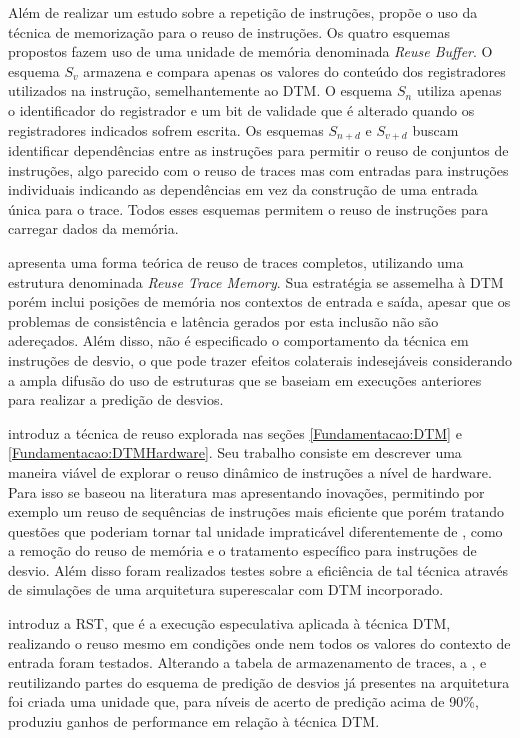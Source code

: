 Além de realizar um estudo sobre a repetição de instruções,  propõe o uso da técnica de memorização para o reuso de instruções. Os quatro esquemas propostos fazem uso de uma unidade de memória denominada \textit{Reuse Buffer}. O esquema $S_{v}$ armazena e compara apenas os valores do conteúdo dos registradores utilizados na instrução, semelhantemente ao DTM. O esquema $S_{n}$ utiliza apenas o identificador do registrador e um bit de validade que é alterado quando os registradores indicados sofrem escrita. Os esquemas $S_{n+d}$ e $S_{v+d}$ buscam identificar dependências entre as instruções para permitir o reuso de conjuntos de instruções, algo parecido com o reuso de traces mas com entradas para instruções individuais indicando as dependências em vez da construção de uma entrada única para o trace. Todos esses esquemas permitem o reuso de instruções para carregar dados da memória.

 apresenta uma forma teórica de reuso de traces completos, utilizando uma estrutura denominada \textit{Reuse Trace Memory}. Sua estratégia se assemelha à DTM porém inclui posições de memória nos contextos de entrada e saída, apesar que os problemas de consistência e latência gerados por esta inclusão não são adereçados. Além disso, não é especificado o comportamento da técnica em instruções de desvio, o que pode trazer efeitos colaterais indesejáveis considerando a ampla difusão do uso de estruturas que se baseiam em execuções anteriores para realizar a predição de desvios.

 introduz a técnica de reuso explorada nas seções \ref{Fundamentacao:DTM} e \ref{Fundamentacao:DTMHardware}. Seu trabalho consiste em descrever uma maneira viável de explorar o reuso dinâmico de instruções a nível de hardware. Para isso se baseou na literatura mas apresentando inovações, permitindo por exemplo um reuso de sequências de instruções mais eficiente que  porém tratando questões que poderiam tornar tal unidade impraticável diferentemente de , como a remoção do reuso de memória e o tratamento específico para instruções de desvio. Além disso foram realizados testes sobre a eficiência de tal técnica através de simulações de uma arquitetura superescalar com DTM incorporado.

 introduz a RST, que é a execução especulativa aplicada à técnica DTM, realizando o reuso mesmo em condições onde nem todos os valores do contexto de entrada foram testados. Alterando a tabela de armazenamento de traces, a \tablet, e reutilizando partes do esquema de predição de desvios já presentes na arquitetura foi criada uma unidade que, para níveis de acerto de predição acima de 90\%, produziu ganhos de performance em relação à técnica DTM.

